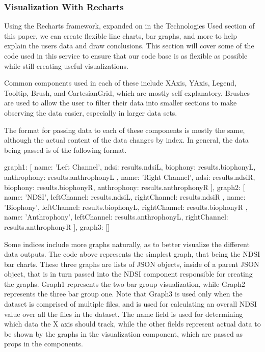 \subsubsection{Visualization With Recharts}
Using the Recharts framework, expanded on in the Technologies Used section of this paper, we can create flexible line charts, bar graphs, and more to help explain the user\textquotesingle s data and draw conclusions. This section will cover some of the code used in this service to ensure that our code base is as flexible as possible while still creating useful visualizations.\par
Common components used in each of these include XAxis, YAxis, Legend, Tooltip, Brush, and CartesianGrid, which are mostly self explanatory. Brushes are used to allow the user to filter their data into smaller sections to make observing the data easier, especially in larger data sets.\par
The format for passing data to each of these components is mostly the same, although the actual content of the data changes by index. In general, the data being passed is of the following format.\par

\begin{javascriptcode}
{
  graph1: [
            {
              name: 'Left Channel',
              ndsi: results.ndsiL,
              biophony: results.biophonyL,
              anthrophony: results.anthrophonyL
            },
            {
              name: 'Right Channel',
              ndsi: results.ndsiR,
              biophony: results.biophonyR,
              anthrophony: results.anthrophonyR
            }
          ],
  graph2: [
            {
              name: 'NDSI',
              leftChannel: results.ndsiL,
              rightChannel: results.ndsiR
            },
            {
              name: 'Biophony',
              leftChannel: results.biophonyL,
              rightChannel: results.biophonyR
            },
            {
              name: 'Anthrophony',
              leftChannel: results.anthrophonyL,
              rightChannel: results.anthrophonyR
            }
          ],
  graph3: []
}
\end{javascriptcode}

Some indices include more graphs naturally, as to better visualize the different data outputs. The code above represents the simplest graph, that being the NDSI bar charts. These three graphs are lists of JSON objects, inside of a parent JSON object, that is in turn passed into the NDSI component responsible for creating the graphs. Graph1 represents the two bar group visualization, while Graph2 represents the three bar group one. Note that Graph3 is used only when the dataset is comprised of multiple files, and is used for calculating an overall NDSI value over all the files in the dataset. The name field is used for determining which data the X axis should track, while the other fields represent actual data to be shown by the graphs in the visualization component, which are passed as props in the components.
